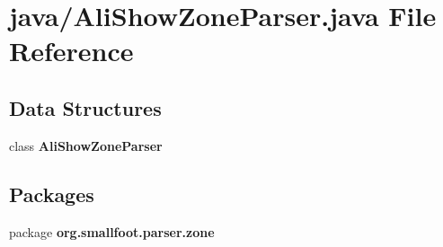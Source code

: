 \section{java/\+Ali\+Show\+Zone\+Parser.java File Reference}
\label{AliShowZoneParser_8java}
\subsection*{Data Structures}
\begin{DoxyCompactItemize}
\item 
class {\bf Ali\+Show\+Zone\+Parser}
\end{DoxyCompactItemize}
\subsection*{Packages}
\begin{DoxyCompactItemize}
\item 
package {\bf org.\+smallfoot.\+parser.\+zone}
\end{DoxyCompactItemize}
